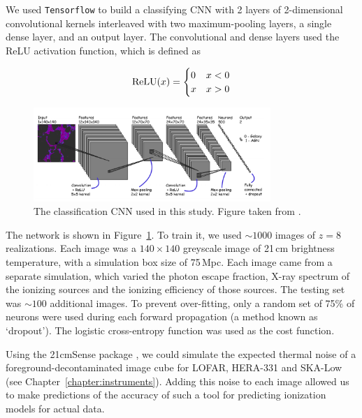 We used {\tt Tensorflow} \citep{tensorflow} to build a classifying CNN with 2 layers of 2-dimensional convolutional kernels interleaved with two maximum-pooling layers, a single dense layer, and an output layer. The convolutional and dense layers used the ReLU activation function, which is defined as

\begin{equation}
{\rm ReLU}(x) = 
\begin{cases} 
      0 & x < 0 \\
      x & x >0 
\end{cases}
\end{equation}

\begin{figure}
\centering
\includegraphics[width=0.8\textwidth]{chapters/hera_ml/figures/hassan-cnn.png}
\caption[The classification CNN used in this study.]{The classification CNN used in this study. Figure taken from \cite{Hassan.18}.}
\label{fig:hassan-cnn}
\end{figure}

The network is shown in Figure~\ref{fig:hassan-cnn}. To train it, we used $\sim 1000$ images of $z=8$ realizations. Each image was a $140\times140$ greyscale image of 21\,cm brightness temperature, with a simulation box size of 75\,Mpc. Each image came from a separate simulation, which varied the photon escape fraction, X-ray spectrum of the ionizing sources and the ionizing efficiency of those sources. The testing set was $\sim 100$ additional images. To prevent over-fitting, only a random set of 75\% of neurons were used during each forward propagation (a method known as `dropout'). The logistic cross-entropy function was used as the cost function.

Using the {\sc 21cmSense} package \citep{Pober.14}, we could simulate the expected thermal noise of a foreground-decontaminated image cube for LOFAR, HERA-331 and SKA-Low (see Chapter~\ref{chapter:instruments}). Adding this noise to each image allowed us to make predictions of the accuracy of such a tool for predicting ionization models for actual data.


